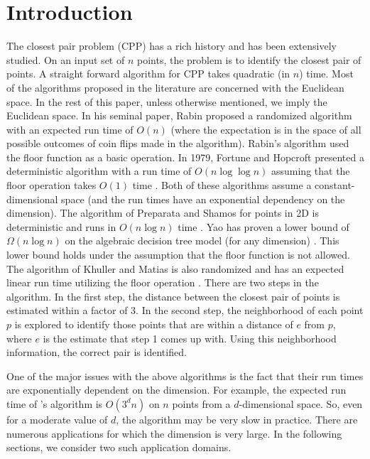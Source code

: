 \documentclass{article}
\theoremstyle{definition}
\theoremstyle{remark}
\begin{document}
\section{Introduction}
\label{intro}
The closest pair problem (CPP) has a rich history and has been extensively studied. On an input set of $n$ points, the problem is to identify the closest pair of points. A straight forward algorithm for CPP takes quadratic (in $n$) time. Most of the algorithms proposed in the literature are concerned with the Euclidean space. In the rest of this paper, unless otherwise mentioned, we imply the Euclidean space. In his seminal paper, Rabin proposed a randomized algorithm with an expected run time of $O(n)$ \cite{RAB76} (where the expectation is in the space of all possible outcomes of coin flips made in the algorithm). Rabin's algorithm used the floor function as a basic operation. In 1979, Fortune and Hopcroft presented a deterministic algorithm with a run time of $O(n\log\log n)$ assuming that the floor operation takes $O(1)$ time  \cite{FH79}. Both of these algorithms assume a constant-dimensional space (and the run times have an exponential dependency on the dimension). The algorithm of Preparata and Shamos for points in 2D is deterministic and runs in $O(n\log n)$ time \cite{PS86}. Yao has proven a lower bound of $\Omega(n\log n)$ on the algebraic decision tree model (for any dimension) \cite{YO91}. This lower bound holds under the assumption that the floor function is not allowed.
The algorithm of Khuller and Matias is also randomized and has an expected linear run time utilizing the floor operation \cite{SY95}. There are two steps in the algorithm. In the first step, the distance between the closest pair of points is estimated within a factor of 3. In the second step, the neighborhood of each point $p$ is explored to identify those points that are within a distance of $e$ from $p$, where $e$ is the estimate that step 1 comes up with. Using this neighborhood information, the correct pair is identified.



One of the major issues with the above algorithms is the fact that their run times are exponentially dependent on the dimension.   For example, the expected run time of \cite{SY95}'s algorithm is $O(3^dn)$ on $n$ points from a $d$-dimensional space. So, even for a moderate value of $d$, the algorithm may be very slow in practice. There are numerous applications for which the dimension is very large. In the following sections, we consider two such application domains.
\end{document}
